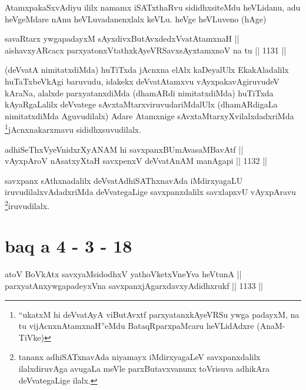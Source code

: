 \begin{artha}
AtamxpakaSxvAdiyu ililx namamx iSATxthaRvu sididhxsiteMdu heVLidanu, adu heVgeMdare nAnu heVLuvadanenxlalx keVLu. heVge heVLuveno (hAge)
\end{artha}

\begin{shl}
savaRtarx ywgapadayxM sAyxdivxButAvxdedxVvatAtamxnaH || \\
aishavxyARcacx parxyatonxVtathxkAyeVRSavxsAyx\s \s tamxnoV na tu \hfill || 1131 ||  
\end{shl}

\begin{artha}
(deVvatA nimitatxdiMda) huTiTxda jAcnxna elAlx kaDeyalUlx EkakAladalilx huTaTxbeVkAgi baruvudu, idakekx deVvatAtamxvu vAyxpakavAgiruvudeV kAraNa, alalxde parxyatanxdiMda (dhamARdi nimitatxdiMda) huTiTxda kAyaRgaLalilx deVvatege sAvxtaMtarxviruvudariMdalUlx (dhamARdigaLa nimitatxdiMda Aguvudilalx) Adare Atamxnige sAvxtaMtarxyXvilalxdadxriMda \footnote{``ukatxM hi deVvatAyA viButAvxtf parxyatanxkAyeVRSu ywga padayxM, na tu vijAcnxnAtamxnaH''eMdu BataqRparxpaMcaru heVLidAdxre (AnaM-TiVke)}jAcnxnakarxmavu sididhxsuvudilalx.
\end{artha}


\begin{shl}
adhiSeThxVyeVnidxrXyANAM hi savxpanxBUmAvasaMBavAtf ||  \\
vAyxpAroV nAsatxyXtaH savxpenxV deVvatAnAM manAgapi \hfill || 1132 ||  
\end{shl}

\begin{artha}
savxpanx sAthxnadalilx deVvatAdhiSAThxnavAda iMdirxyagaLU iruvudilalxvAdadxriMda deVvategaLige savxpanxdalilx savxlapxvU vAyxpAravu \footnote{tananx adhiSATxnavAda niyamayx iMdirxyagaLeV savxpanxdalilx ilalxdiruvAga avugaLa meVle parxButavxvanunx toVrisuva adhikAra deVvategaLige ilalx.}iruvudilalx.
\end{artha}

\section*{baq a 4 - 3 - 18}


\begin{shl}
atoV BoVkAtx savxyaMsidodhxV yathoVketxVneYva heVtunA || \\
parxyatAnxywgapadeyxVna savxpanxjAgarxdavxyAdidhxrukf \hfill || 1133 ||  
\end{shl}

